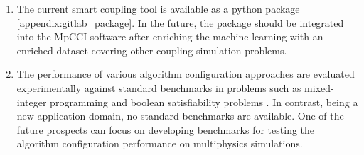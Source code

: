 \begin{enumerate}
\item The current smart coupling tool is available as a python package \ref{appendix:gitlab_package}. In the future, the package should be integrated into the MpCCI software after enriching the machine learning with an enriched dataset covering other coupling simulation problems.

\item The performance of various algorithm configuration approaches are evaluated experimentally against standard benchmarks in problems such as mixed-integer programming and boolean satisfiability problems \cite{Hutterphd}. In contrast, being a new application domain, no standard benchmarks are available. One of the future prospects can focus on developing benchmarks for testing the algorithm configuration performance on multiphysics simulations.

\end{enumerate}


